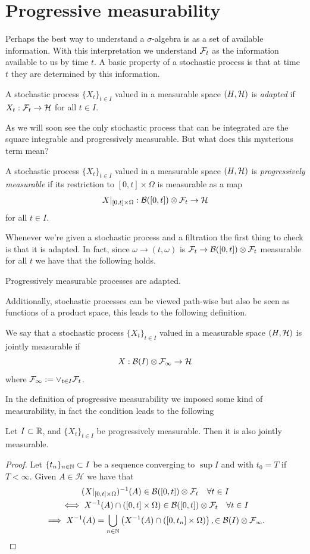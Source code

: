 \documentclass[
    a4paper,
    DIV=14,
    abstract=true,
    numbers=noenddot
]{scrartcl}
\begin{document}
\section{Progressive measurability}
Perhaps the best way to understand a $\sigma$-algebra is as a set of available information. With this interpretation we understand $\mathcal{F}_t$ as the information available to us by time $t$. A basic property of a stochastic process is that at time $t$ they are determined by this information.
\begin{definition}
A stochastic process $\{X_t\}_{t\in I}$ valued in a measurable space $(H,\mathcal{H})$ is \emph{adapted} if $X_t : \mathcal{F}_t \to \mathcal{H}$ for all $t \in I$.
\end{definition}
As we will soon see the only stochastic process that can be integrated are the square integrable and progressively measurable. But what does this mysterious term mean?
\begin{definition}\label{prog def}
	A stochastic process $\{X_t\}_{t\in I}$ valued in a measurable space $(H,\mathcal{H})$ is \emph{progressively measurable} if its restriction to $[0,t]\times\Omega$ is measurable as a map $$X|_{[0,t]\times\Omega} : \mathcal{B}([0,t])\otimes\mathcal{F}_t\to \mathcal{H}$$ for all $t\in I$.
\end{definition}
Whenever we're given a stochastic process and a filtration the first thing to check is that it is adapted. In fact, since $\omega\to(t,\omega)$ is $\mathcal{F}_t\to \mathcal{B}([0,t])\otimes \mathcal{F}_t$ measurable for all $t$ we have that the following holds.
\begin{lemma}
	Progressively measurable processes are adapted.
\end{lemma}
Additionally, stochastic processes can be viewed path-wise but also be seen as functions of a product space, this leads to the following definition.
\begin{definition}
	We say that a stochastic process $\{X_t\}_{t\in I}$ valued in a measurable space $(H,\mathcal{H})$ is jointly measurable if $$X:\mathcal{B}(I)\otimes\mathcal{F}_\infty\to \mathcal{H}$$
	where $\mathcal{F}_\infty:=\vee_{t\in I}\mathcal{F}_t$.
\end{definition}
In the definition of progressive measurability we imposed some kind of measurability, in fact the condition leads to the following
\begin{proposition}
	Let $I\subset\mathbb{R}$, and $\{X_t\}_{t\in I}$ be progressively measurable. Then it is also jointly measurable.
\end{proposition}
\begin{proof}
	Let  $\{t_n\}_{n\in\mathbb{N}}\subset I$ be a sequence converging to $\sup I$ and with $t_0=T$ if $T<\infty$. Given $A\in\mathcal{H}$ we have that
	\begin{multline*}
		(X|_{[0,t]\times\Omega})^{-1}(A)\in\mathcal{B}([0,t])\otimes\mathcal{F}_t\quad\forall t\in I\\ \iff X^{-1}(A)\cap([0,t]\times\Omega)\in\mathcal{B}([0,t])\otimes\mathcal{F}_t\quad\forall t\in I\\\implies X^{-1}(A)=\bigcup_{n \in  \mathbb{N}}\left(X^{-1}(A)\cap([0,t_n]\times\Omega)\right), \in\mathcal{B}(I)\otimes\mathcal{F}_\infty.
	\end{multline*}
\end{proof}
\end{document}
